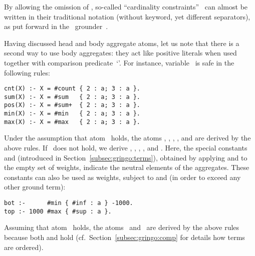 \begin{note}
By allowing the omission of ,
so-called ``cardinality constraints''~\cite{siniso02a}
can almost be written in their traditional notation (without keyword, yet different separators),
as put forward in the \lparse\ grounder~\cite{lparseManual}.
\end{note}

Having discussed head and body aggregate atoms,
let us note that there is a second way to use body aggregates:
they act like positive literals when used together with comparison predicate~`\code{=}'.
For instance, variable~ is safe in the following rules:
\begin{lstlisting}[numbers=none]
cnt(X) :- X = #count { 2 : a; 3 : a }.
sum(X) :- X = #sum   { 2 : a; 3 : a }.
pos(X) :- X = #sum+  { 2 : a; 3 : a }.
min(X) :- X = #min   { 2 : a; 3 : a }.
max(X) :- X = #max   { 2 : a; 3 : a }.
\end{lstlisting}
Under the assumption that atom~ holds,
the atoms 
,
,
,
, and
 are
derived by the above rules.
If~ does not hold, we derive
,
,
,
, and
.
%
Here, the special constants  and 
(introduced in Section~\ref{subsec:gringo:terms}),
obtained by applying  and  to the empty set of weights,
indicate the neutral elements of the aggregates.
%
These constants can also be used as weights, subject to
 and  (in order to exceed any other ground term):
\begin{lstlisting}[numbers=none]
bot :-      #min { #inf : a } -1000.
top :- 1000 #max { #sup : a }.
\end{lstlisting}
Assuming that atom~ holds,
the atoms~ and~ are derived by the above rules
because both  and  hold
(cf.~Section~\ref{subsec:gringo:comp} for details how terms are ordered).

